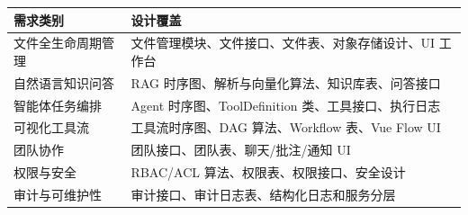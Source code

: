 \documentclass[a4paper,zihao=-4]{ctexart}
\begin{document}
\begin{longtable}{|>{\raggedright\arraybackslash}p{2.4cm}|>{\raggedright\arraybackslash}p{\dimexpr(\linewidth-2.4cm-4\tabcolsep-3\arrayrulewidth)/1\relax}|}
\hline
需求类别 & 设计覆盖\tabularnewline
\hline
\endhead
文件全生命周期管理 & 文件管理模块、文件接口、文件表、对象存储设计、UI 工作台\tabularnewline
\hline
自然语言知识问答 & RAG 时序图、解析与向量化算法、知识库表、问答接口\tabularnewline
\hline
智能体任务编排 & Agent 时序图、ToolDefinition 类、工具接口、执行日志\tabularnewline
\hline
可视化工具流 & 工具流时序图、DAG 算法、Workflow 表、Vue Flow UI\tabularnewline
\hline
团队协作 & 团队接口、团队表、聊天/批注/通知 UI\tabularnewline
\hline
权限与安全 & RBAC/ACL 算法、权限表、权限接口、安全设计\tabularnewline
\hline
审计与可维护性 & 审计接口、审计日志表、结构化日志和服务分层\tabularnewline
\hline
\end{longtable}
\end{document}
